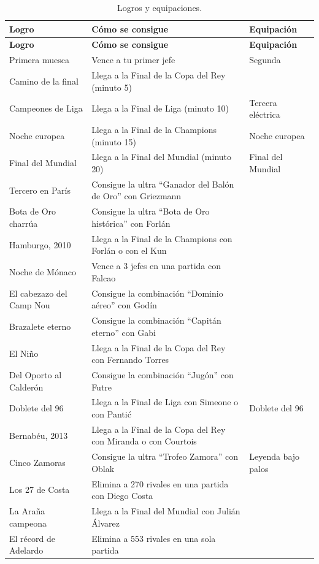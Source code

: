 \begin{longtable}{@{}L{2.2cm} L{4.5cm} L{2.8cm}@{}}
\caption{Logros y equipaciones.}\label{tab:juego-logros}\\
\toprule
\textbf{Logro} & \textbf{Cómo se consigue} & \textbf{Equipación} \\ \midrule \endfirsthead
\toprule
\textbf{Logro} & \textbf{Cómo se consigue} & \textbf{Equipación} \\ \midrule \endhead
Primera muesca & Vence a tu primer jefe & Segunda \\
Camino de la final & Llega a la Final de la Copa del Rey (minuto 5) &  \\
Campeones de Liga & Llega a la Final de Liga (minuto 10) & Tercera eléctrica \\
Noche europea & Llega a la Final de la Champions (minuto 15) & Noche europea \\
Final del Mundial & Llega a la Final del Mundial (minuto 20) & Final del Mundial \\
Tercero en París & Consigue la ultra ``Ganador del Balón de Oro'' con Griezmann &  \\
Bota de Oro charrúa & Consigue la ultra ``Bota de Oro histórica'' con Forlán &  \\
Hamburgo, 2010 & Llega a la Final de la Champions con Forlán o con el Kun &  \\
Noche de Mónaco & Vence a 3 jefes en una partida con Falcao &  \\
El cabezazo del Camp Nou & Consigue la combinación ``Dominio aéreo'' con Godín &  \\
Brazalete eterno & Consigue la combinación ``Capitán eterno'' con Gabi &  \\
El Niño & Llega a la Final de la Copa del Rey con Fernando Torres &  \\
Del Oporto al Calderón & Consigue la combinación ``Jugón'' con Futre &  \\
Doblete del 96 & Llega a la Final de Liga con Simeone o con Pantić & Doblete del 96 \\
Bernabéu, 2013 & Llega a la Final de la Copa del Rey con Miranda o con Courtois &  \\
Cinco Zamoras & Consigue la ultra ``Trofeo Zamora'' con Oblak & Leyenda bajo palos \\
Los 27 de Costa & Elimina a 270 rivales en una partida con Diego Costa &  \\
La Araña campeona & Llega a la Final del Mundial con Julián Álvarez &  \\
El récord de Adelardo & Elimina a 553 rivales en una sola partida &  \\

\end{longtable}
